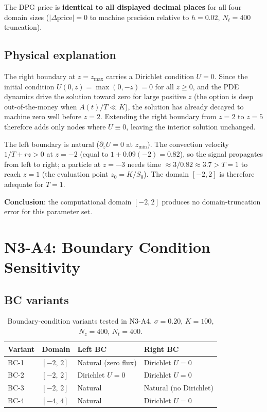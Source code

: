 \documentclass[11pt,a4paper]{article}
\newcommand{\Nz}{N_z}
\newcommand{\Nt}{N_t}
\begin{document}
The DPG price is \textbf{identical to all displayed decimal places}
for all four domain sizes ($|\Delta\text{price}| = 0$ to machine precision
relative to $h = 0.02$, $\Nt = 400$ truncation).

\subsection{Physical explanation}

The right boundary at $z = z_{\max}$ carries a Dirichlet condition
$U = 0$.  Since the initial condition $U(0, z) = \max(0, -z) = 0$ for
all $z \ge 0$, and the PDE dynamics drive the solution toward zero for
large positive $z$ (the option is deep out-of-the-money when $A(t)/T \ll K$),
the solution has already decayed to machine zero well before $z = 2$.
Extending the right boundary from $z = 2$ to $z = 5$ therefore adds
only nodes where $U \equiv 0$, leaving the interior solution unchanged.

The left boundary is natural ($\partial_z U = 0$ at $z_{\min}$).
The convection velocity $1/T + rz > 0$ at $z = -2$ (equal to $1 +
0.09(-2) = 0.82$), so the signal propagates from left to right; a
particle at $z = -3$ needs time $\approx 3/0.82 \approx 3.7 > T = 1$
to reach $z = 1$ (the evaluation point $z_0 = K/S_0$).  The domain
$[-2, 2]$ is therefore adequate for $T = 1$.

\textbf{Conclusion}: the computational domain $[-2, 2]$ produces no
domain-truncation error for this parameter set.

\section{N3-A4: Boundary Condition Sensitivity}

\subsection{BC variants}

\begin{table}[htbp]
\centering
\caption{Boundary-condition variants tested in N3-A4.
         $\sigma = 0.20$, $K = 100$, $\Nz = 400$, $\Nt = 400$.}
\label{tab:bc}
\begin{tabular}{llll}
\toprule
Variant & Domain & Left BC & Right BC \\
\midrule
BC-1 & $[-2,\,2]$ & Natural (zero flux) & Dirichlet $U=0$ \\
BC-2 & $[-2,\,2]$ & Dirichlet $U=0$ & Dirichlet $U=0$ \\
BC-3 & $[-2,\,2]$ & Natural & Natural (no Dirichlet) \\
BC-4 & $[-4,\,4]$ & Natural & Dirichlet $U=0$ \\
\bottomrule
\end{tabular}
\end{table}
\end{document}
